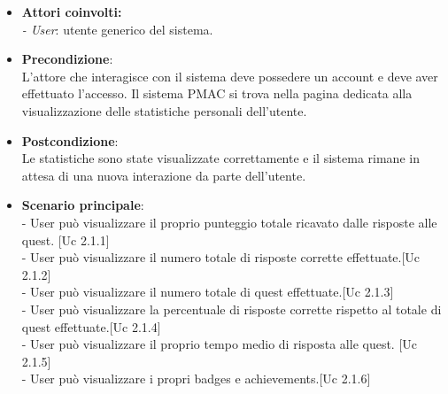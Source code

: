 {\begin{itemize}

\item \textbf{Attori coinvolti:}\\
\emph{- User}: utente generico del sistema.

\item \textbf{Precondizione}:\\
L'attore che interagisce con il sistema deve possedere un account e deve aver effettuato l'accesso. Il sistema PMAC si trova nella pagina dedicata alla visualizzazione delle statistiche personali dell'utente.

\item \textbf{Postcondizione}:\\
Le statistiche sono state visualizzate correttamente e il sistema rimane in attesa di una nuova interazione da parte dell'utente.

\item \textbf{Scenario principale}:\\
- User può visualizzare il proprio punteggio totale ricavato dalle risposte alle quest. [Uc 2.1.1]\\
- User può visualizzare il numero totale di risposte corrette effettuate.[Uc 2.1.2]\\
- User può visualizzare il numero totale di quest effettuate.[Uc 2.1.3]\\
- User può visualizzare la percentuale di risposte corrette rispetto al totale di quest effettuate.[Uc 2.1.4]\\
- User può visualizzare il proprio tempo medio di risposta alle quest. [Uc 2.1.5]\\
- User può visualizzare i propri badges e achievements.[Uc 2.1.6]
\end{itemize}

\newpage

}
